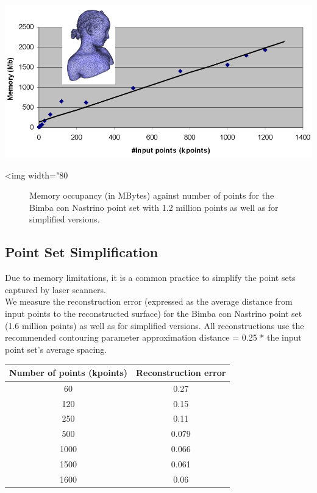 \begin{center}
    \label{Surface_reconstruction_points_3-fig-memory_bench}
    \begin{ccTexOnly}
      \includegraphics[width=1.0\textwidth]{Surface_reconstruction_points_3/memory_bench}
    \end{ccTexOnly}
    \begin{ccHtmlOnly}
        <img width="80%
    \end{ccHtmlOnly}
    \begin{figure}[h]
        \caption{Memory occupancy (in MBytes) against number of points
                 for the Bimba con Nastrino point set with 1.2 million points
                 as well as for simplified versions.}
    \end{figure}
\end{center}



\subsection{Point Set Simplification}

Due to memory limitations, it is a common practice to simplify the point sets captured by laser scanners.\\
We measure the reconstruction error (expressed as the average distance from input points to the reconstructed surface) for the Bimba con Nastrino point set (1.6 million points) as well as for simplified versions. All reconstructions use the recommended contouring parameter approximation distance = 0.25 * the input point set's average spacing.

\begin{tabular}{|c|c|}
  \hline
  Number of points (kpoints) & Reconstruction error \\
  \hline
  60                         & 0.27 \\
  120                        & 0.15 \\
  250                        & 0.11 \\
  500                        & 0.079 \\
  1000                       & 0.066 \\
  1500                       & 0.061 \\
  1600                       & 0.06 \\
  \hline
\end{tabular}

